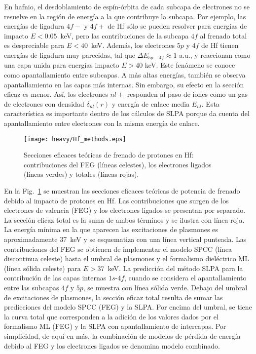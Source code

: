 En hafnio, el desdoblamiento de espín-órbita de cada subcapa de 
electrones no se resuelve en la región de energía a la que contribuye 
la subcapa. Por ejemplo, las energías de ligadura $4f-$ y $4f+$ de Hf 
sólo se pueden resolver para energías de impacto $E<0.05$~keV, pero las 
contribuciones de la subcapa $4f$ al frenado total es despreciable para 
$E<40$~keV. Además, los electrones $5p$ y $4f$ de Hf tienen energías de 
ligadura muy parecidas, tal que $\Delta E_{5p-4f} \approx 1$ a.u., y 
reaccionan como una capa unida para energías impacto $E>40$ keV. Este 
fenómeno se conoce como apantallamiento entre subcapas. A más altas 
energías, también se 
observa apantallamiento en las capas más internas. Sin embargo, su 
efecto en la sección eficaz es menor.
Así, los electrones $nl\pm$ responden al paso de iones como un gas de 
electrones con densidad $\delta_{nl}(r)$ y energía de enlace media 
$E_{nl}$. Esta característica es importante dentro de los cálculos de 
SLPA porque da cuenta del apantallamiento entre electrones con la misma 
energía de enlace. 

\begin{figure}[t]
\centering
\texttt{[image: heavy/Hf\_methods.eps]}
\caption[Secciones eficaces teóricas de frenado de protones en Hf.]
{Secciones eficaces teóricas de frenado de protones en Hf: 
contribuciones del FEG (líneas celestes), los electrones ligados 
(líneas verdes) y totales (líneas rojas).} 
\label{fig:Hf_methods}
\end{figure}

En la Fig.~\ref{fig:Hf_methods} se muestran las secciones eficaces 
teóricas de potencia de frenado debido al impacto de protones en Hf. 
Las contribuciones que surgen de los electrones de valencia (FEG) y los
electrones ligados se presentan por separado. La sección eficaz total es 
la suma de ambos términos y se ilustra con línea roja. La energía mínima 
en la que aparecen las excitaciones de plasmones es aproximadamente 
37~keV y se esquematiza con una línea vertical punteada. Las 
contribuciones del FEG se obtienen de implementar el modelo SPCC (línea 
discontinua celeste) hasta el umbral de plasmones y el formalismo 
dieléctrico ML (línea sólida celeste) para $E>37$~keV. La predicción del 
método SLPA para la contribución de las capas internas $1s$-$4f$, cuando 
se considera el apantallamiento entre las subcapas $4f$ y $5p$, se 
muestra con línea sólida verde. Debajo del umbral de excitaciones de 
plasmones, la sección eficaz total resulta de sumar las predicciones del 
modelo SPCC (FEG) y la SLPA. Por encima del umbral, se tiene la curva
total que corresponden a la adición de los valores dados por el 
formalismo ML (FEG) y la SLPA con apantallamiento de intercapas. Por 
simplicidad, de aquí en más, la combinación de modelos de pérdida de 
energía debido al FEG y los electrones ligados se denomina modelo 
combinado.

